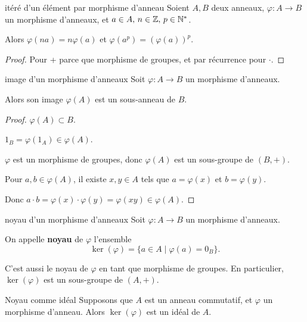 \begin{proposition}{ itéré d'un élément par morphisme d'anneau }{}
    Soient $A, B$ deux anneaux, $\varphi : A \to B$ un morphisme d'anneaux, 
    et ${a \in A}, \, {n \in \mathbb{Z}}, \, {p \in \mathbb{N}^*}$. 

    Alors $\varphi(na) = n \varphi(a)$ et $\varphi(a^p) = (\varphi(a))^p$.

\end{proposition}

\begin{proof}
    Pour + parce que morphisme de groupes, et par récurrence pour $\cdot$.
\end{proof}

\begin{proposition}{image d'un morphisme d'anneaux}{}
    Soit $\varphi : A \to B$ un morphisme d'anneaux. 

    Alors son image $\varphi(A)$ est un sous-anneau de $B$.
\end{proposition}

\begin{proof}
    $\varphi(A) \subset B$.

    $1_B = \varphi(1_A) \in \varphi(A)$.

    $\varphi$ est un morphisme de groupes, donc $\varphi(A)$ est un sous-groupe de $(B, +)$.

    Pour $a, b \in \varphi(A)$, il existe $x, y \in A$ tels que $a = \varphi(x)$ et $b = \varphi(y)$.

    Donc $a \cdot b = \varphi(x) \cdot \varphi(y) = \varphi(xy) \in \varphi(A)$.

\end{proof}

\begin{definition}{noyau d'un morphisme d'anneaux}{}
    Soit $\varphi : A \to B$ un morphisme d'anneaux. 

    On appelle \textbf{noyau} de $\varphi$ l'ensemble 
    \[
        \ker(\varphi) = \{a \in A \mid \varphi(a) = 0_B\}.
    \]

    C'est aussi le noyau de $\varphi$ en tant que morphisme de groupes. En particulier, 
    $\ker(\varphi)$ est un sous-groupe de $(A, +)$.
    
\end{definition}

\begin{proposition}{Noyau comme idéal}{}
    Supposons que $A$ est un anneau commutatif, et $\varphi$ un morphisme d'anneau. 
    Alors $\ker(\varphi)$ est un idéal de $A$.
\end{proposition}

